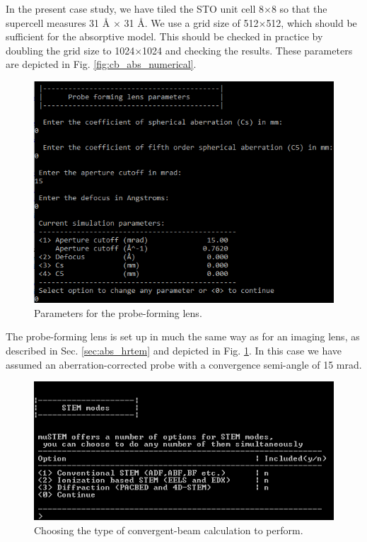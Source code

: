 \documentclass[12pt,a4paper]{article}
\newcommand{\by}{$\times$}
\begin{document}
In the present case study, we have tiled the STO unit cell 8\by8 so that the supercell measures 31 \AA{} \by{} 31 \AA{}.
We use a grid size of 512\by512, which should be sufficient for the absorptive model.
This should be checked in practice by doubling the grid size to 1024\by1024 and checking the results.
These parameters are depicted in Fig. \ref{fig:cb_abs_numerical}.

\begin{figure}[!h]
\begin{center}
    \includegraphics[scale=0.75]{figures/cb_abs_lens.png}
\caption{Parameters for the probe-forming lens.}
\label{fig:cb_abs_lens}
\end{center}
\end{figure}

The probe-forming lens is set up in much the same way as for an imaging lens, as described in Sec. \ref{sec:abs_hrtem} and depicted in Fig. \ref{fig:cb_abs_lens}.
In this case we have assumed an aberration-corrected probe with a convergence semi-angle of 15 mrad.



\begin{figure}[!h]
\begin{center}
    \includegraphics[scale=0.75]{figures/cb_abs_types.png}
\caption{Choosing the type of convergent-beam calculation to perform.}
\label{fig:cb_abs_types}
\end{center}
\end{figure}
\end{document}
